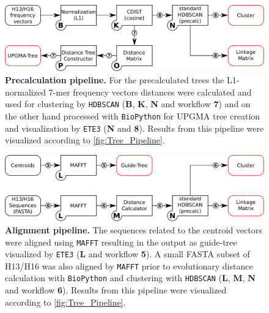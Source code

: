 \begin{figure}[!hbt]
    \centering
    \includegraphics[width=\textwidth]{Graphics/Precalculated.pdf}
    \caption[Precalculation pipeline]{\textbf{Precalculation pipeline.} For the precalculated trees the L1-normalized 7-mer frequency vectors distances were calculated and used for clustering by \texttt{HDBSCAN} (\textsf{\textbf{B}}, \textsf{\textbf{K}}, \textsf{\textbf{N}} and workflow \textsf{\textbf{7}}) and on the other hand processed with \texttt{BioPython} for \gls{UPGMA} tree creation and visualization by \texttt{ETE3} (\textsf{\textbf{N}} and \textsf{\textbf{8}}). Results from this pipeline were visualized according to \autoref{fig:Tree_Pipeline}.}
    \label{fig:Precalc_Pipeline}
\end{figure}

\begin{figure}[!hbt]
    \centering
    \includegraphics[width=\textwidth]{Graphics/Alignment.pdf}
    \caption[Alignment pipeline]{\textbf{Alignment pipeline.} The sequences related to the centroid vectors were aligned using \texttt{MAFFT} resulting in the output as guide-tree visualized by \texttt{ETE3} (\textsf{\textbf{L}} and workflow \textsf{\textbf{5}}). A small FASTA subset of H13/H16 was also aligned by \texttt{MAFFT} prior to evolutionary distance calculation with \texttt{BioPython} and clustering with \texttt{HDBSCAN} (\textsf{\textbf{L}}, \textsf{\textbf{M}}, \textsf{\textbf{N}} and workflow \textsf{\textbf{6}}). Results from this pipeline were visualized according to \autoref{fig:Tree_Pipeline}.}
    \label{fig:Alignment_Pipeline}
\end{figure}


